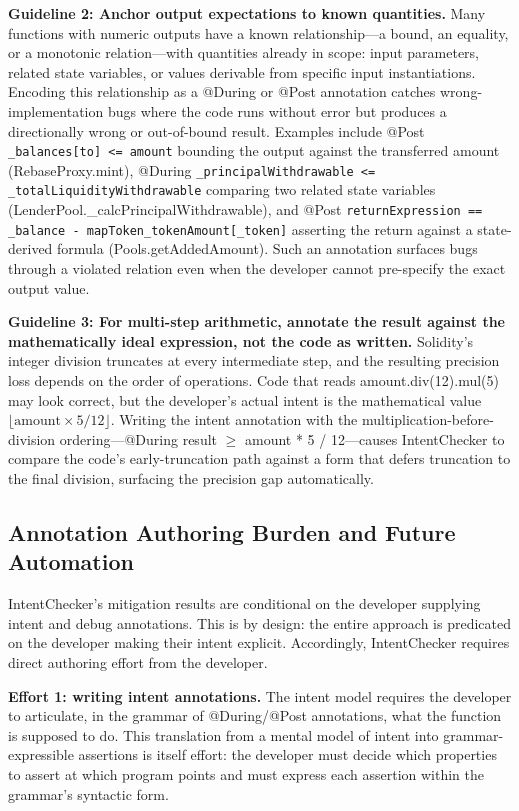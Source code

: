 \documentclass[pdflatex,sn-basic]{sn-jnl}%
\theoremstyle{thmstyleone}%
\theoremstyle{thmstyletwo}%
\theoremstyle{thmstylethree}%
\begin{document}
\smallskip
\noindent\textbf{Guideline 2: Anchor output expectations to known quantities.}
Many functions with numeric outputs have a known relationship---a bound, an equality, or a monotonic relation---with quantities already in scope: input parameters, related state variables, or values derivable from specific input instantiations.
Encoding this relationship as a @During or @Post annotation catches wrong-implementation bugs where the code runs without error but produces a directionally wrong or out-of-bound result.
Examples include @Post \texttt{\_balances[to] <= amount} bounding the output against the transferred amount (RebaseProxy.mint), @During \texttt{\_principalWithdrawable <= \_totalLiquidityWithdrawable} comparing two related state variables (LenderPool.\_calcPrincipalWithdrawable), and @Post \texttt{returnExpression == \_balance - mapToken\_tokenAmount[\_token]} asserting the return against a state-derived formula (Pools.getAddedAmount).
Such an annotation surfaces bugs through a violated relation even when the developer cannot pre-specify the exact output value.

\smallskip
\noindent\textbf{Guideline 3: For multi-step arithmetic, annotate the result against the mathematically ideal expression, not the code as written.}
Solidity's integer division truncates at every intermediate step, and the resulting precision loss depends on the order of operations.
Code that reads amount.div(12).mul(5) may look correct, but the developer's actual intent is the mathematical value $\lfloor\text{amount} \times 5 / 12\rfloor$.
Writing the intent annotation with the multiplication-before-division ordering---@During result $\geq$ amount * 5 / 12---causes IntentChecker to compare the code's early-truncation path against a form that defers truncation to the final division, surfacing the precision gap automatically.

\subsection{Annotation Authoring Burden and Future Automation}\label{sec:disc:burden}

IntentChecker's mitigation results are conditional on the developer supplying intent and debug annotations.
This is by design: the entire approach is predicated on the developer making their intent explicit. Accordingly, IntentChecker requires direct authoring effort from the developer.

\smallskip
\noindent\textbf{Effort 1: writing intent annotations.}
The intent model requires the developer to articulate, in the grammar of @During/@Post annotations, what the function is supposed to do. This translation from a mental model of intent into grammar-expressible assertions is itself effort: the developer must decide which properties to assert at which program points and must express each assertion within the grammar's syntactic form.
\end{document}
